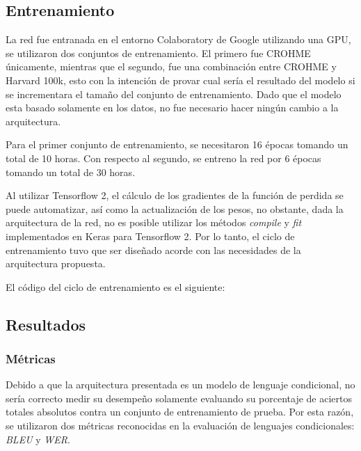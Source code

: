 



\subsection{Entrenamiento}

La red fue entranada en el entorno Colaboratory de Google utilizando una GPU, se utilizaron dos conjuntos de entrenamiento. El primero fue CROHME únicamente, mientras que el segundo, fue una combinación entre CROHME y Harvard 100k, esto con la intención de provar cual sería el resultado del modelo si se incrementara el tamaño del conjunto de entrenamiento. Dado que el modelo esta basado solamente en los datos, no fue necesario hacer ningún cambio a la arquitectura.

Para el primer conjunto de entrenamiento, se necesitaron 16 épocas tomando un total de 10 horas. Con respecto al segundo, se entreno la red por 6 épocas tomando un total de 30 horas.

Al utilizar Tensorflow 2, el cálculo de los gradientes de la función de perdida se puede automatizar, así como la actualización de los pesos, no obstante, dada la arquitectura de la red, no es posible utilizar los métodos \textit{compile} y \textit{fit} implementados en Keras para Tensorflow 2. Por lo tanto, el ciclo de entrenamiento tuvo que ser diseñado acorde con las necesidades de la arquitectura propuesta.

El código del ciclo de entrenamiento es el siguiente:



\subsection{Resultados}

\subsubsection{Métricas}

Debido a que la arquitectura presentada es un modelo de lenguaje condicional, no sería correcto medir su desempeño solamente evaluando su porcentaje de aciertos totales absolutos contra un conjunto de entrenamiento de prueba. Por esta razón, se utilizaron dos métricas reconocidas en la evaluación de lenguajes condicionales: \textit{BLEU} y \textit{WER}.

